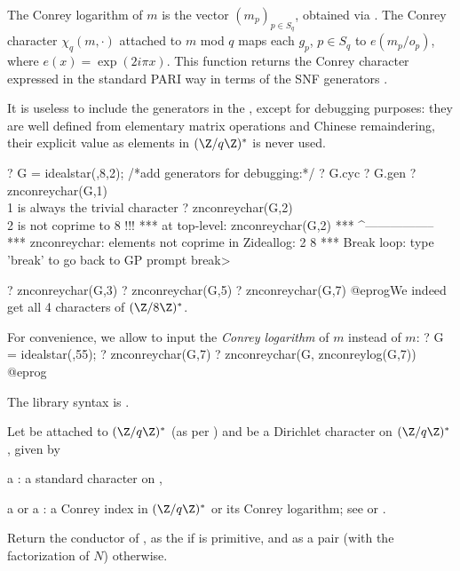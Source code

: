 The Conrey logarithm of $m$ is the vector $(m_p)_{p\in S_q}$, obtained
via . The Conrey character $\chi_q(m,\cdot)$  attached to
$m$ mod $q$ maps
each $g_p$, $p\in S_q$ to $e(m_p / o_p)$, where $e(x) = \exp(2i\pi x)$.
This function returns the Conrey character expressed in the standard PARI
way in terms of the SNF generators .

 It is useless to include the generators
in the , except for debugging purposes: they are well defined from
elementary matrix operations and Chinese remaindering, their explicit value
as elements in $(\Z/q\Z)^*$ is never used.

\bprog
? G = idealstar(,8,2); /*add generators for debugging:*/
? G.cyc
? G.gen
? znconreychar(G,1)  \\ 1 is always the trivial character
? znconreychar(G,2)  \\ 2 is not coprime to 8 !!!
  ***   at top-level: znconreychar(G,2)
  ***                 ^-----------------
  *** znconreychar: elements not coprime in Zideallog:
    2
    8
  ***   Break loop: type 'break' to go back to GP prompt
break>

? znconreychar(G,3)
? znconreychar(G,5)
? znconreychar(G,7)
@eprog\noindent We indeed get all 4 characters of $(\Z/8\Z)^*$.

For convenience, we allow to input the \emph{Conrey logarithm} of $m$
instead of $m$:
\bprog
? G = idealstar(,55);
? znconreychar(G,7)
? znconreychar(G, znconreylog(G,7))
@eprog

The library syntax is .

\label{se:znconreyconductor}
Let  be attached to $(\Z/q\Z)^*$ (as per
) and  be a Dirichlet character on
$(\Z/q\Z)^*$, given by

\item a : a standard character on ,

\item a  or a : a Conrey index in $(\Z/q\Z)^*$ or its
Conrey logarithm;
see  or .

Return the conductor of , as the  
if  is primitive, and as a pair \kbd{[N, faN]} (with  the
factorization of $N$) otherwise.

